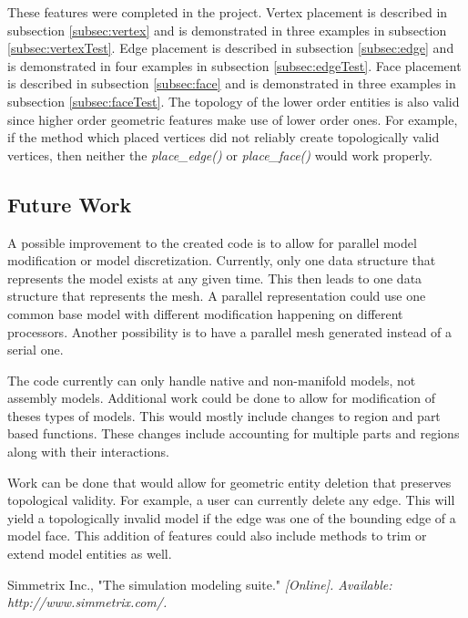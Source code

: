\documentclass[a4paper, 12pt]{article}
\begin{document}
These features were completed in the project.
Vertex placement is described in subsection \ref{subsec:vertex}
and is demonstrated in three examples in subsection \ref{subsec:vertexTest}.
Edge placement is described in subsection \ref{subsec:edge}
and is demonstrated in four examples in subsection \ref{subsec:edgeTest}.
Face placement is described in subsection \ref{subsec:face}
and is demonstrated in three examples in subsection \ref{subsec:faceTest}.
The topology of the lower order entities is also valid since 
higher order geometric features make use of lower order ones.
For example, if the method which placed vertices did not reliably create
topologically valid vertices, then neither the \emph{place\_edge()} or 
\emph{place\_face()} would work properly. 

\subsection{Future Work} \label{subsec:future}
A possible improvement to the created code is to allow for parallel 
model modification or model discretization. Currently, only one
data structure that represents the model exists at any given time. 
This then leads to one data structure that represents the mesh. 
A parallel representation could use one common base model 
with different modification happening on different processors. 
Another possibility is to have a parallel mesh generated 
instead of a serial one.

The code currently can only handle native and non-manifold models, 
not assembly models. Additional work could be done to allow
for modification of theses types of models. This would mostly
include changes to region and part based functions. These changes 
include accounting for multiple parts and regions along with 
their interactions.

Work can be done that would allow for geometric entity deletion
that preserves topological validity. For example, a user can 
currently delete any edge. This will yield a topologically 
invalid model if the edge was one of the bounding edge of a 
model face. This addition of features could also
include methods to trim or extend model entities as well. 

\newpage
\begin{thebibliography}{99}

Simmetrix Inc., 
"The simulation modeling suite."
\textit{[Online]. Available: http://www.simmetrix.com/.}

\end{thebibliography}
\end{document}
